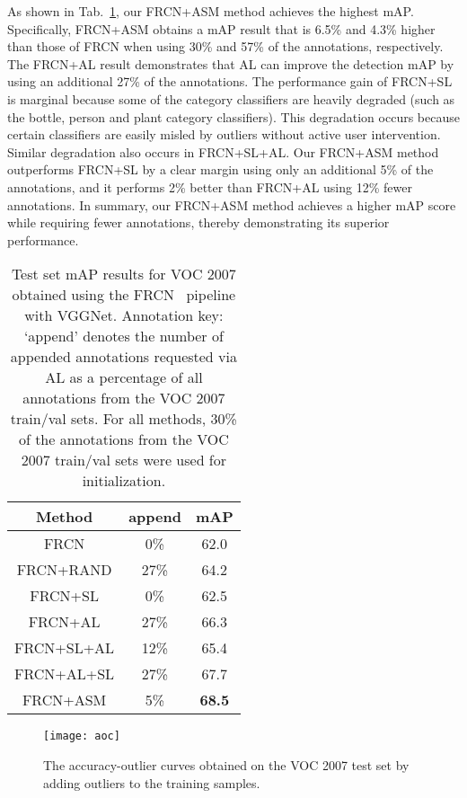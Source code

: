 \documentclass[journal]{IEEEtran}
\begin{document}
{As shown in Tab.~\ref{tab:07mAP}, our FRCN+{ASM} method achieves the highest mAP.  Specifically, FRCN+{ASM} obtains a mAP result that is 6.5\% and 4.3\% higher than those of FRCN when using 30\% and 57\% of the annotations, respectively. The FRCN+AL result demonstrates that AL can improve the detection mAP by using an additional 27\% of the annotations. The performance gain of FRCN+SL is marginal because some of the category classifiers are heavily degraded (such as the bottle, person and plant category classifiers). This degradation occurs because certain classifiers are easily misled by outliers without active user intervention. Similar degradation also occurs in FRCN+SL+AL. Our FRCN+{ASM} method outperforms FRCN+SL by a clear margin using only an additional 5\% of the annotations, and it performs 2\% better than FRCN+AL using 12\% fewer annotations. In summary, our FRCN+{ASM} method achieves a higher mAP score while requiring fewer annotations, thereby demonstrating its superior performance.

\begin{table}[t]
\footnotesize
\center
\setlength{\tabcolsep}{2pt}
\caption{Test set mAP results for VOC 2007 obtained using the FRCN~\cite{ren2015faster} pipeline with VGGNet. Annotation key: `append' denotes the number of appended annotations requested via AL as a percentage of all annotations from the VOC 2007 train/val sets. For all methods, 30\% of the annotations from the VOC 2007 train/val sets were used for initialization.}\label{tab:07mAP}
\vspace{-8pt}
\begin{tabular}{c | c | c }
\hline
\hline
Method & append & mAP \\
\hline
FRCN  & 0\% &  62.0 \\
FRCN+RAND  & 27\% & 64.2  \\
FRCN+SL  & 0\% & 62.5 \\
FRCN+AL  & 27\% & 66.3 \\
FRCN+SL+AL  & 12\%  & 65.4\\
FRCN+AL+SL  & 27\% & 67.7  \\
FRCN+{ASM} & 5\% & \bf 68.5 \\
\hline
\hline
\end{tabular}
\vspace{-5pt}
\end{table}

\begin{figure}[tbp]
\center
\texttt{[image: aoc]}
\vspace{-5pt}
\caption{The accuracy-outlier curves obtained on the VOC 2007 test set by adding outliers to the training samples.}
\vspace{-8pt}
\label{fig:aoc}
\end{figure}

}
\end{document}
